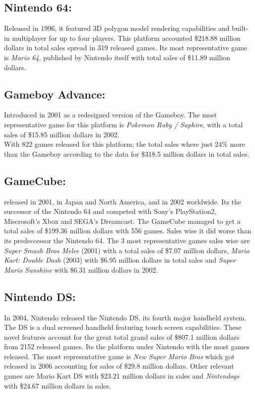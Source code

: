 \subsection{Nintendo 64:} Released in 1996, it featured 3D polygon model
rendering capabilities and built-in multiplayer for up to four
players\cite{Nintendo}. This platform accounted \$218.88 million dollars in
total sales spread in 319 released games. Its most representative game is
\textit{Mario 64}, published by Nintendo itself with total sales of \$11.89 million
dollars.\\

\subsection{Gameboy Advance:} Introduced in 2001 as a redesigned version of
the Gameboy\cite{Nintendo}. The most representative game for this platform is
\textit{Pokemon Ruby / Saphire}, with a total sales of \$15.85 million dollars
in 2002.\\
With 822 games released for this platform; the total sales where just 24\%
more than the Gameboy according to the data for \$318.5 million dollars in
total sales.\\

\subsection{GameCube:} released in 2001, in Japan and North America, and in
2002 worldwide. Its the successor of the Nintendo 64 and competed with Sony's
PlayStation2, Miscrosoft's Xbox and SEGA's Dreamcast\cite{Nintendo}. The
GameCube managed to get a total sales of \$199.36 million dollars with 556
games. Sales wise it did worse than its predeccessor the Nintendo 64. The 3
most representative games sales wise are \textit{Super Smash Bros Melee} (2001) with a
total sales of \$7.07 million dollars, \textit{Mario Kart: Double Dash} (2003) with \$6.95
million dollars in total sales and \textit{Super Mario Sunshine} with \$6.31 million
dollars in 2002.

\subsection{Nintendo DS:} In 2004, Nintendo released the Nintendo DS, its
fourth major handheld system. The DS is a dual screened handheld featuring
touch screen capabilities\cite{Nintendo}. These novel features account for
the great total grand sales of \$807.1 million dollars from 2152 released
games. Its the platform under Nintendo with the most games released. The most
representative game is \textit{New Super Mario Bros} which got released in 2006
accounting for sales of \$29.8 million dollars. Other relevant games are
Mario Kart DS with \$23.21 million dollars in sales and \textit{Nintendogs} with \$24.67
million dollars in sales.\\

